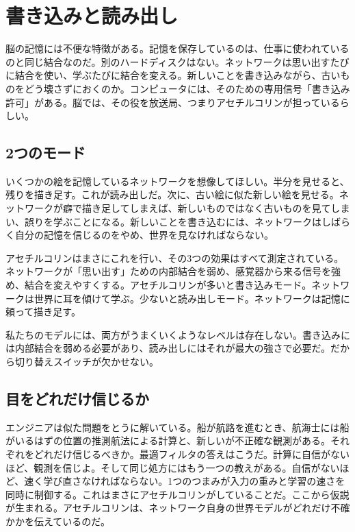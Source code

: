 \chapter{書き込みと読み出し}

脳の記憶には不便な特徴がある。記憶を保存しているのは、仕事に使われているのと同じ結合なのだ。別のハードディスクはない。ネットワークは思い出すたびに結合を使い、学ぶたびに結合を変える。新しいことを書き込みながら、古いものをどう壊さずにおくのか。コンピュータには、そのための専用信号「書き込み許可」がある。脳では、その役を放送局、つまりアセチルコリンが担っているらしい。

\section*{2つのモード}

いくつかの絵を記憶しているネットワークを想像してほしい。半分を見せると、残りを描き足す。これが読み出しだ。次に、古い絵に似た新しい絵を見せる。ネットワークが癖で描き足してしまえば、新しいものではなく古いものを見てしまい、誤りを学ぶことになる。新しいことを書き込むには、ネットワークはしばらく自分の記憶を信じるのをやめ、世界を見なければならない。


アセチルコリンはまさにこれを行い、その3つの効果はすべて測定されている。ネットワークが「思い出す」ための内部結合を弱め、感覚器から来る信号を強め、結合を変えやすくする。アセチルコリンが多いと書き込みモード。ネットワークは世界に耳を傾けて学ぶ。少ないと読み出しモード。ネットワークは記憶に頼って描き足す。

私たちのモデルには、両方がうまくいくようなレベルは存在しない。書き込みには内部結合を弱める必要があり、読み出しにはそれが最大の強さで必要だ。だから切り替えスイッチが欠かせない。

\section*{目をどれだけ信じるか}

エンジニアは似た問題をとうに解いている。船が航路を進むとき、航海士には船がいるはずの位置の推測航法による計算と、新しいが不正確な観測がある。それぞれをどれだけ信じるべきか。最適フィルタの答えはこうだ。計算に自信がないほど、観測を信じよ。そして同じ処方にはもう一つの教えがある。自信がないほど、速く学び直さなければならない。1つのつまみが入力の重みと学習の速さを同時に制御する。これはまさにアセチルコリンがしていることだ。ここから仮説が生まれる。アセチルコリンは、ネットワーク自身の世界モデルがどれだけ不確かかを伝えているのだ。


